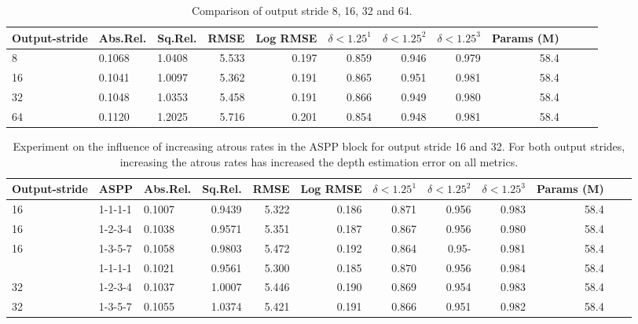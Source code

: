
\begin{table}[ht]
    \centering
    \begin{tabular}{lllrrrrrrrrr}
    \toprule
     Output-stride & Abs.Rel. &  Sq.Rel. &   RMSE &  Log RMSE &     $\delta < 1.25^1$ &     $\delta < 1.25^2$ &     $\delta < 1.25^3$ &      Params (M) \\
    \midrule 
           8   &   0.1068  &  1.0408  &  5.533  &  0.197  &  0.859  &  0.946  &  0.979 & 58.4\\
           16  &   0.1041  &  1.0097  &  5.362  &  0.191  &  0.865  &  0.951  &  0.981 & 58.4\\
           32  &   0.1048  &  1.0353  &  5.458  &  0.191  &  0.866  &  0.949  &  0.980 & 58.4\\
           64  &   0.1120  &  1.2025  &  5.716  &  0.201  &  0.854  &  0.948  &  0.981 & 58.4\\
    \bottomrule
    \end{tabular}
    \caption{Comparison of output stride 8, 16, 32 and 64.}
\end{table}


\begin{table}[ht]
    \centering
    \begin{tabular}{lllrrrrrrrrr}
    \toprule
     Output-stride & ASPP &  Abs.Rel. &  Sq.Rel. &   RMSE &  Log RMSE &     $\delta < 1.25^1$ &     $\delta < 1.25^2$ &     $\delta < 1.25^3$ &      Params (M) \\
    \midrule 
           16  &  1-1-1-1 &   0.1007  &  0.9439  &  5.322  &  0.186  &  0.871  &  0.956  &  0.983 & 58.4\\
           16  &  1-2-3-4 &   0.1038  &  0.9571  &  5.351  &  0.187  &  0.867  &  0.956  &  0.980 & 58.4\\
           16  &  1-3-5-7 &   0.1058  &  0.9803  &  5.472  &  0.192  &  0.864  &  0.95-  &  0.981 & 58.4 \\
           \addlinespace
           32  &  1-1-1-1 &   0.1021  &  0.9561  &  5.300  &  0.185  &  0.870  &  0.956  &  0.984 & 58.4 \\
           32  &  1-2-3-4 &   0.1037  &  1.0007  &  5.446  &  0.190  &  0.869  &  0.954  &  0.983 & 58.4 \\
           32  &  1-3-5-7 &   0.1055  &  1.0374  &  5.421  &  0.191  &  0.866  &  0.951  &  0.982 & 58.4 \\
    \bottomrule
    \end{tabular}
    \caption{Experiment on the influence of increasing atrous rates in the ASPP block for output stride 16 and 32. For both output strides, increasing the atrous rates has increased the depth estimation error on all metrics.}
\end{table}



